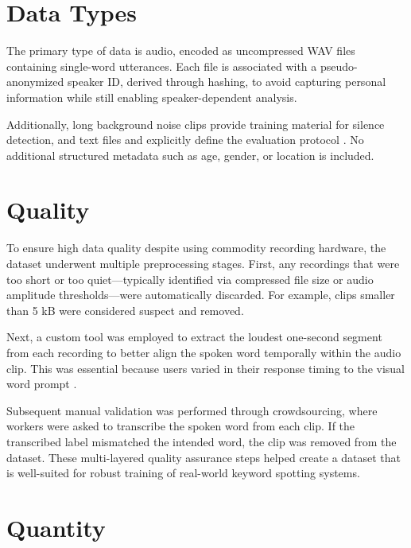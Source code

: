 \section{Data Types}

The primary type of data is audio, encoded as uncompressed WAV files containing single-word utterances. Each file is associated with a pseudo-anonymized speaker ID, derived through hashing, to avoid capturing personal information while still enabling speaker-dependent analysis.

\bigskip

Additionally, long background noise clips provide training material for silence detection, and text files  and  explicitly define the evaluation protocol \cite{Warden:2020}. No additional structured metadata such as age, gender, or location is included.

\section{Quality}

To ensure high data quality despite using commodity recording hardware, the dataset underwent multiple preprocessing stages. First, any recordings that were too short or too quiet—typically identified via compressed file size or audio amplitude thresholds—were automatically discarded. For example, clips smaller than 5 kB were considered suspect and removed.

\bigskip

Next, a custom tool was employed to extract the loudest one-second segment from each recording to better align the spoken word temporally within the audio clip. This was essential because users varied in their response timing to the visual word prompt \cite{Warden:2020}.

\bigskip

Subsequent manual validation was performed through crowdsourcing, where workers were asked to transcribe the spoken word from each clip. If the transcribed label mismatched the intended word, the clip was removed from the dataset. These multi-layered quality assurance steps helped create a dataset that is well-suited for robust training of real-world keyword spotting systems.

\section{Quantity}

